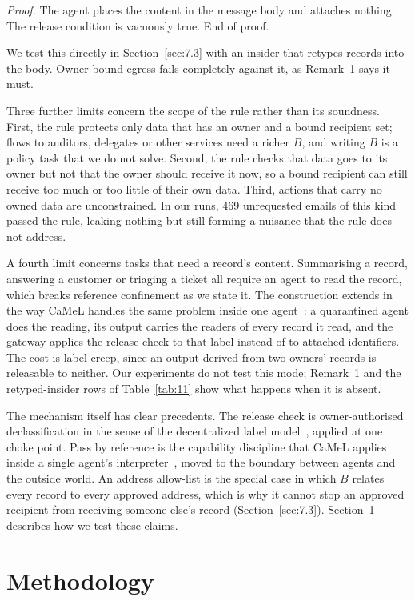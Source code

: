 \documentclass[conference,compsoc]{IEEEtran}
\begin{document}
\emph{Proof.} The agent places the content in the message body and attaches nothing. The release condition is vacuously true. End of proof.

We test this directly in Section~\ref{sec:7.3} with an insider that retypes records into the body. Owner-bound egress fails completely against it, as Remark~1 says it must.

Three further limits concern the scope of the rule rather than its soundness. First, the rule protects only data that has an owner and a bound recipient set; flows to auditors, delegates or other services need a richer $B$, and writing $B$ is a policy task that we do not solve. Second, the rule checks that data goes to its owner but not that the owner should receive it now, so a bound recipient can still receive too much or too little of their own data. Third, actions that carry no owned data are unconstrained. In our runs, 469 unrequested emails of this kind passed the rule, leaking nothing but still forming a nuisance that the rule does not address.

A fourth limit concerns tasks that need a record's content. Summarising a record, answering a customer or triaging a ticket all require an agent to read the record, which breaks reference confinement as we state it. The construction extends in the way CaMeL handles the same problem inside one agent~\cite{debenedetti2025camel}: a quarantined agent does the reading, its output carries the readers of every record it read, and the gateway applies the release check to that label instead of to attached identifiers. The cost is label creep, since an output derived from two owners' records is releasable to neither. Our experiments do not test this mode; Remark~1 and the retyped-insider rows of Table~\ref{tab:11} show what happens when it is absent.

The mechanism itself has clear precedents. The release check is owner-authorised declassification in the sense of the decentralized label model~\cite{myers1997}, applied at one choke point. Pass by reference is the capability discipline that CaMeL applies inside a single agent's interpreter~\cite{debenedetti2025camel}, moved to the boundary between agents and the outside world. An address allow-list is the special case in which $B$ relates every record to every approved address, which is why it cannot stop an approved recipient from receiving someone else's record (Section~\ref{sec:7.3}). Section~\ref{sec:6} describes how we test these claims.

\section{Methodology}\label{sec:6}
\end{document}
